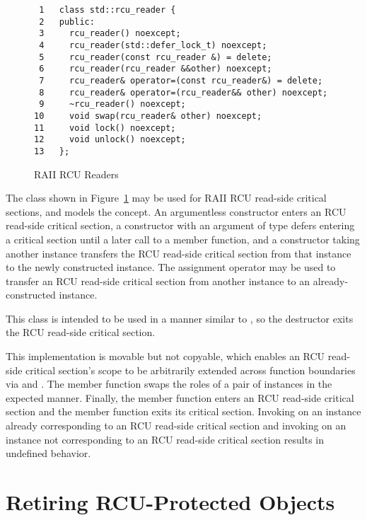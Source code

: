 \documentclass[letterpaper,10pt]{article}
\begin{document}
\begin{figure}[tbp]
{ \scriptsize
\begin{verbatim}
 1   class std::rcu_reader {
 2   public:
 3     rcu_reader() noexcept;
 4     rcu_reader(std::defer_lock_t) noexcept;
 5     rcu_reader(const rcu_reader &) = delete;
 6     rcu_reader(rcu_reader &&other) noexcept;
 7     rcu_reader& operator=(const rcu_reader&) = delete;
 8     rcu_reader& operator=(rcu_reader&& other) noexcept;
 9     ~rcu_reader() noexcept;
10     void swap(rcu_reader& other) noexcept;
11     void lock() noexcept;
12     void unlock() noexcept;
13   };
\end{verbatim}
}
\caption{RAII RCU Readers}
\label{fig:RAII RCU Readers}
\end{figure}

The  class shown in
Figure~\ref{fig:RAII RCU Readers}
may be used for RAII RCU read-side critical sections, and
models the  concept.
An argumentless constructor enters an RCU read-side critical section,
a constructor with an argument of type  defers
entering a critical section until a later call to a
 member function,
and a constructor taking another  instance
transfers the RCU read-side critical section from that instance
to the newly constructed instance.
The assignment operator may be used to transfer an RCU read-side critical
section from another  instance to an already-constructed
instance.

This class is intended to be used in a manner similar to ,
so the destructor exits the RCU read-side critical section.

This implementation is movable but not copyable, which enables
an RCU read-side critical section's scope to be arbitrarily
extended across function boundaries via  and
.
The  member function swaps the roles
of a pair of  instances in the expected manner.
Finally, the  member function enters an
RCU read-side critical section and the 
member function exits its critical section.
Invoking  on an instance already corresponding
to an RCU read-side critical section and invoking
 on an instance not corresponding to
an RCU read-side critical section results in undefined behavior.

\section{Retiring RCU-Protected Objects}
\label{sec:Retiring RCU-Protected Objects}
\end{document}
